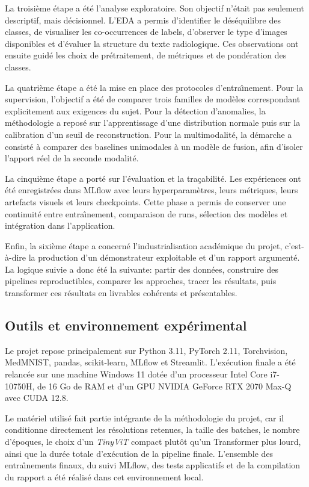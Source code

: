\documentclass[11pt,a4paper]{article}
\begin{document}
La troisi\`eme \'etape a \'et\'e l'analyse exploratoire. Son objectif n'\'etait pas seulement descriptif, mais d\'ecisionnel. L'EDA a permis d'identifier le d\'es\'equilibre des classes, de visualiser les co-occurrences de labels, d'observer le type d'images disponibles et d'\'evaluer la structure du texte radiologique. Ces observations ont ensuite guid\'e les choix de pr\'etraitement, de m\'etriques et de pond\'eration des classes.

La quatri\`eme \'etape a \'et\'e la mise en place des protocoles d'entra\^\i nement. Pour la supervision, l'objectif a \'et\'e de comparer trois familles de mod\`eles correspondant explicitement aux exigences du sujet. Pour la d\'etection d'anomalies, la m\'ethodologie a repos\'e sur l'apprentissage d'une distribution normale puis sur la calibration d'un seuil de reconstruction. Pour la multimodalit\'e, la d\'emarche a consist\'e \`a comparer des baselines unimodales \`a un mod\`ele de fusion, afin d'isoler l'apport r\'eel de la seconde modalit\'e.

La cinqui\`eme \'etape a port\'e sur l'\'evaluation et la tra\c{c}abilit\'e. Les exp\'eriences ont \'et\'e enregistr\'ees dans MLflow avec leurs hyperparam\`etres, leurs m\'etriques, leurs artefacts visuels et leurs checkpoints. Cette phase a permis de conserver une continuit\'e entre entra\^\i nement, comparaison de runs, s\'election des mod\`eles et int\'egration dans l'application.

Enfin, la sixi\`eme \'etape a concern\'e l'industrialisation acad\'emique du projet, c'est-\`a-dire la production d'un d\'emonstrateur exploitable et d'un rapport argument\'e. La logique suivie a donc \'et\'e la suivante: partir des donn\'ees, construire des pipelines reproductibles, comparer les approches, tracer les r\'esultats, puis transformer ces r\'esultats en livrables coh\'erents et pr\'esentables.

\subsection{Outils et environnement exp\'erimental}
Le projet repose principalement sur Python 3.11, PyTorch 2.11, Torchvision, MedMNIST, pandas, scikit-learn, MLflow et Streamlit. L'ex\'ecution finale a \'et\'e relanc\'ee sur une machine Windows 11 dot\'ee d'un processeur Intel Core i7-10750H, de 16 Go de RAM et d'un GPU NVIDIA GeForce RTX 2070 Max-Q avec CUDA 12.8.

Le mat\'eriel utilis\'e fait partie int\'egrante de la m\'ethodologie du projet, car il conditionne directement les r\'esolutions retenues, la taille des batches, le nombre d'\'epoques, le choix d'un \emph{TinyViT} compact plut\^ot qu'un Transformer plus lourd, ainsi que la dur\'ee totale d'ex\'ecution de la pipeline finale. L'ensemble des entra\^\i nements finaux, du suivi MLflow, des tests applicatifs et de la compilation du rapport a \'et\'e r\'ealis\'e dans cet environnement local.
\end{document}
